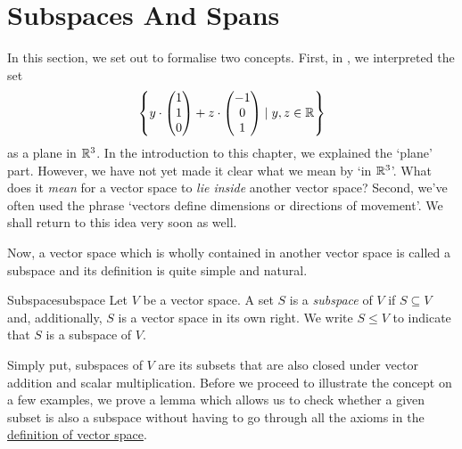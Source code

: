 \section{Subspaces And Spans}
\label{sec:subspaces-and-spans}

In this section, we set out to formalise two concepts. First, in
, we interpreted
the set
\[
 \left\{ y \cdot 
  \begin{pmatrix}
   1\\
   1\\
   0
  \end{pmatrix}
  + z \cdot 
  \begin{pmatrix}
   -1\\
    0\\
    1
  \end{pmatrix} \mid y,z \in \mathbb{R}
 \right\}
\]
as a plane in $\mathbb{R}^3$. In the introduction to this chapter, we explained the
`plane' part. However, we have not yet made it clear what we mean by `in
$\mathbb{R}^3$'. What does it \emph{mean} for a vector space to \emph{lie inside}
another vector space? Second, we've often used the phrase `vectors define
dimensions or directions of movement'. We shall return to this idea very soon as
well.

Now, a vector space which is wholly contained in another vector space is called
a subspace and its definition is quite simple and natural.

\begin{definition}{Subspace}{subspace}
 Let $V$ be a vector space. A set $S$ is a \emph{subspace} of $V$ if $S
 \subseteq V$ and, additionally, $S$ is a vector space in its own right. We
 write $S \leq V$ to indicate that $S$ is a subspace of $V$.
\end{definition}

Simply put, subspaces of $V$ are its subsets that are also closed under vector
addition and scalar multiplication. Before we proceed to illustrate the concept
on a few examples, we prove a lemma which allows us to check whether a given
subset is also a subspace without having to go through all the axioms in the
\hyperref[def:abstract-vector-space]{definition of vector space}.

